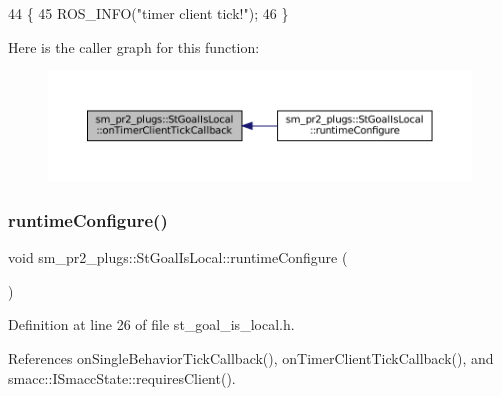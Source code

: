 \begin{DoxyCode}
44     \{
45         ROS\_INFO(\textcolor{stringliteral}{"timer client tick!"});
46     \}
\end{DoxyCode}
Here is the caller graph for this function\+:
\nopagebreak
\begin{figure}[H]
\begin{center}
\leavevmode
\includegraphics[width=350pt]{structsm__pr2__plugs_1_1StGoalIsLocal_a3a851e3468f6b247139f16abd1b91af3_icgraph}
\end{center}
\end{figure}
\mbox{\label{structsm__pr2__plugs_1_1StGoalIsLocal_aeddacc72a9eefe2a51d24564874f1610}} 
\subsubsection{\texorpdfstring{runtime\+Configure()}{runtimeConfigure()}}
{\footnotesize\ttfamily void sm\+\_\+pr2\+\_\+plugs\+::\+St\+Goal\+Is\+Local\+::runtime\+Configure (\begin{DoxyParamCaption}{ }\end{DoxyParamCaption})\hspace{0.3cm}{\ttfamily [inline]}}



Definition at line 26 of file st\+\_\+goal\+\_\+is\+\_\+local.\+h.



References on\+Single\+Behavior\+Tick\+Callback(), on\+Timer\+Client\+Tick\+Callback(), and smacc\+::\+I\+Smacc\+State\+::requires\+Client().


